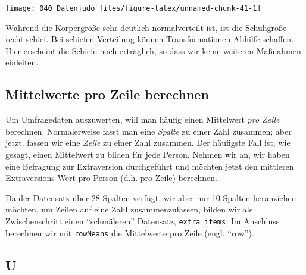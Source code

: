 \documentclass[12pt,]{book}
\newenvironment{Shaded}{\begin{snugshade}}{\end{snugshade}}
\newcommand{\KeywordTok}[1]{\textcolor[rgb]{0.13,0.29,0.53}{\textbf{{#1}}}}
\newcommand{\StringTok}[1]{\textcolor[rgb]{0.31,0.60,0.02}{{#1}}}
\newcommand{\NormalTok}[1]{{#1}}
\begin{document}
\begin{center}\texttt{[image: 040\_Datenjudo\_files/figure-latex/unnamed-chunk-41-1]} \end{center}

Während die Körpergröße sehr deutlich normalverteilt ist, ist die
Schuhgröße recht schief. Bei schiefen Verteilung können Transformationen
Abhilfe schaffen. Hier erscheint die Schiefe noch erträglich, so dass
wir keine weiteren Maßnahmen einleiten.

\subsection{Mittelwerte pro Zeile
berechnen}\label{mittelwerte-pro-zeile-berechnen}

Um Umfragedaten auszuwerten, will man häufig einen Mittelwert \emph{pro
Zeile} berechnen. Normalerweise fasst man eine \emph{Spalte} zu einer
Zahl zusammen; aber jetzt, fassen wir eine \emph{Zeile} zu einer Zahl
zusammen. Der häufigste Fall ist, wie gesagt, einen Mittelwert zu bilden
für jede Person. Nehmen wir an, wir haben eine Befragung zur
Extraversion durchgeführt und möchten jetzt den mittleren
Extraversions-Wert pro Person (d.h. pro Zeile) berechnen.

\begin{Shaded}
\end{Shaded}

Da der Datensatz über 28 Spalten verfügt, wir aber nur 10 Spalten
heranziehen möchten, um Zeilen auf eine Zahl zusammenzufassen, bilden
wir als Zwischenschritt einen ``schmäleren'' Datensatz,
\texttt{extra\_items}. Im Anschluss berechnen wir mit \texttt{rowMeans}
die Mittelwerte pro Zeile (engl. ``row'').

\subsection{U}\label{u}

\begin{Shaded}
\end{Shaded}
\end{document}
